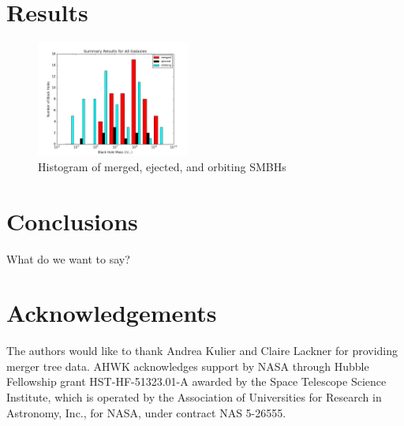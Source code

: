 \documentclass[english, apj]{emulateapj}
\begin{document}
\section{Results}\label{sec:results}
\begin{figure}[H]
\begin{center}
\includegraphics[width=0.45\textwidth]{plots/Summary_Results_All_Galaxies.png}
\caption{Histogram of merged, ejected, and orbiting SMBHs}
\label{fig:meosmbh}
\end{center}
\end{figure}

\section{Conclusions}\label{sec:conclusions}
What do we want to say?



\section*{Acknowledgements}

The authors would like to thank Andrea Kulier and Claire Lackner for providing merger tree data. AHWK acknowledges support by NASA through Hubble Fellowship grant HST-HF-51323.01-A awarded by the Space Telescope Science Institute, which is operated by the Association of Universities for Research in Astronomy, Inc., for NASA, under contract NAS 5-26555. 








\end{document}
